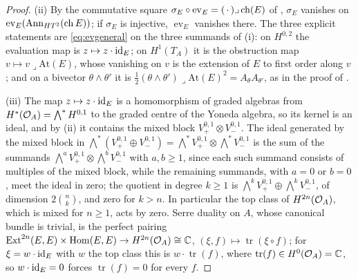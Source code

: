 \begin{proof}
(ii) By the commutative square $\sigma_{E}\circ\operatorname{ev}_{E}
=(\,\cdot\,)\lrcorner\operatorname{ch}(E)$ of , $\sigma_{E}$
vanishes on $\operatorname{ev}_{E}(\operatorname{Ann}_{HT^{2}}(\operatorname{ch} E))$; if $\sigma_{E}$
is injective, $\operatorname{ev}_{E}$ vanishes there. The three explicit
statements are \eqref{eq:evgeneral} on the three summands of (i): on
$H^{0,2}$ the evaluation map is $z\mapsto z\cdot\operatorname{id}_{E}$; on $H^{1}(T_{A})$
it is the obstruction map $v\mapsto v\lrcorner\mathrm{At}(E)$, whose
vanishing on $v$ is the extension of $E$ to first order along $v$
\cite{Tod09}; and on a bivector $\theta\wedge\theta'$ it is
$\tfrac12(\theta\wedge\theta')\lrcorner\mathrm{At}(E)^{2}
=A_{\theta}A_{\theta'}$, as in the proof of .

(iii) The map $z\mapsto z\cdot\operatorname{id}_{E}$ is a homomorphism of graded algebras
from $H^{*}(\mathcal{O}_{A})=\bigwedge^{*}H^{0,1}$ to the graded centre of the Yoneda
algebra, so its kernel is an ideal, and by (ii) it contains the mixed block
$V_{+}^{0,1}\otimes V_{-}^{0,1}$. The ideal generated by the mixed block in
$\bigwedge^{*}(V_{+}^{0,1}\oplus V_{-}^{0,1})
=\bigwedge^{*}V_{+}^{0,1}\otimes\bigwedge^{*}V_{-}^{0,1}$ is the sum of the
summands $\bigwedge^{a}V_{+}^{0,1}\otimes\bigwedge^{b}V_{-}^{0,1}$ with
$a,b\ge1$, since each such summand consists of multiples of the mixed block,
while the remaining summands, with $a=0$ or $b=0$, meet the ideal in zero; the
quotient in degree $k\ge1$ is $\bigwedge^{k}V_{+}^{0,1}\oplus\bigwedge^{k}V_{-}^{0,1}$,
of dimension $2\binom{n}{k}$, and zero for $k>n$. In particular the top class
of $H^{2n}(\mathcal{O}_{A})$, which is mixed for $n\ge1$, acts by zero. Serre duality
on $A$, whose canonical bundle is trivial, is the perfect pairing
$\operatorname{Ext}^{2n}(E,E)\times\operatorname{Hom}(E,E)\to H^{2n}(\mathcal{O}_{A})\cong\mathbb{C}$,
$(\xi,f)\mapsto\operatorname{tr}(\xi\circ f)$; for $\xi=w\cdot\operatorname{id}_{E}$
with $w$ the top class this is $w\cdot\operatorname{tr}(f)$, where
$\operatorname{tr}(f)\in H^{0}(\mathcal{O}_{A})=\mathbb{C}$, so $w\cdot\operatorname{id}_{E}=0$ forces
$\operatorname{tr}(f)=0$ for every $f$.


\end{proof}

